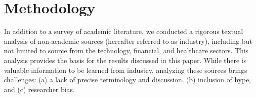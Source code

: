 
\section{Methodology}
\label{sec:method}

In addition to a survey of academic literature, we conducted a rigorous textual analysis of non-academic sources (hereafter referred to as industry),
including but not limited to source from the technology, financial, and healthcare sectors.
This analysis provides the basis for the results discussed in this paper.
While there is valuable information to be learned from industry, analyzing 
these sources brings challenges: (a) a lack of precise terminology and 
discussion, (b) inclusion of hype, and (c) researcher bias.

